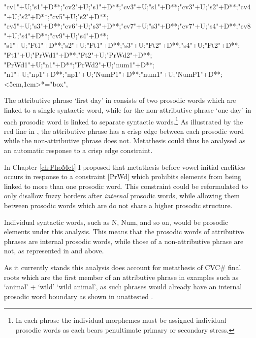 \begin{multicols}{2}
\begin{exe}
{			"cv1"+U;"s1"+D**\dir{-};"cv2"+U;"s1"+D**\dir{-};"cv3"+U;"s1"+D**\dir{-};"cv3"+U;"s2"+D**\dir{-};"cv4"+U;"s2"+D**\dir{-};"cv5"+U;"s2"+D**\dir{-};
			"cv5"+U;"s3"+D**\dir{-};"cv6"+U;"s3"+D**\dir{-};"cv7"+U;"s3"+D**\dir{-};"cv7"+U;"s4"+D**\dir{-};"cv8"+U;"s4"+D**\dir{-};"cv9"+U;"s4"+D**\dir{-};
			"s1"+U;"Ft1"+D**\dir{-};"s2"+U;"Ft1"+D**\dir{-};"s3"+U;"Ft2"+D**\dir{-};"s4"+U;"Ft2"+D**\dir{-};
			"Ft1"+U;"PrWd1"+D**\dir{-};"Ft2"+U;"PrWd2"+D**\dir{-};
			"PrWd1"+U;"n1"+D**\dir{-};"PrWd2"+U;"num1"+D**\dir{-};
			"n1"+U;"np1"+D**\dir{-};"np1"+U;"NumP1"+D**\dir{-};"num1"+U;"NumP1"+D**\dir{-};
			<5em,1cm>*="box",
		\endxy}\label{as:neno-meseq}
	\end{exe}
\end{multicols}

The attributive phrase  `first day' in 
consists of two prosodic words which are linked to a single syntactic word,
while for the non-attributive phrase  `one day' in 
each prosodic word is linked to separate syntactic words.\footnote{
		In each phrase the individual morphemes must be assigned individual
		prosodic words as each bears penultimate primary or secondary stress.}
As illustrated by the red line in ,
the attributive phrase has a crisp edge between
each prosodic word while the non-attributive phrase does not.
Metathesis could thus be analysed as an
automatic response to a crisp edge constraint.

In Chapter \ref{ch:PhoMet} I proposed that metathesis
before vowel-initial enclitics occurs in response to
a constraint [PrWd] which prohibits
elements from being linked to more than one prosodic word.
This constraint could be reformulated to only disallow
fuzzy borders after \emph{internal} prosodic words,
while allowing them between prosodic words
which are do not share a higher prosodic structure.

Individual syntactic words, such as N, Num, and so on,
would be prosodic elements under this analysis.
This means that the prosodic words of attributive
phrases are internal prosodic words,
while those of a non-attributive phrase are not,
as represented in  and  above.

As it currently stands this analysis does
account for metathesis of CVC{\#} final roots
which are the first member of an attributive phrase
in examples such as  `animal' +  `wild'
{\ra}   \bracr{} `wild animal',
as such phrases would already have an internal prosodic
word boundary as shown in unattested .

